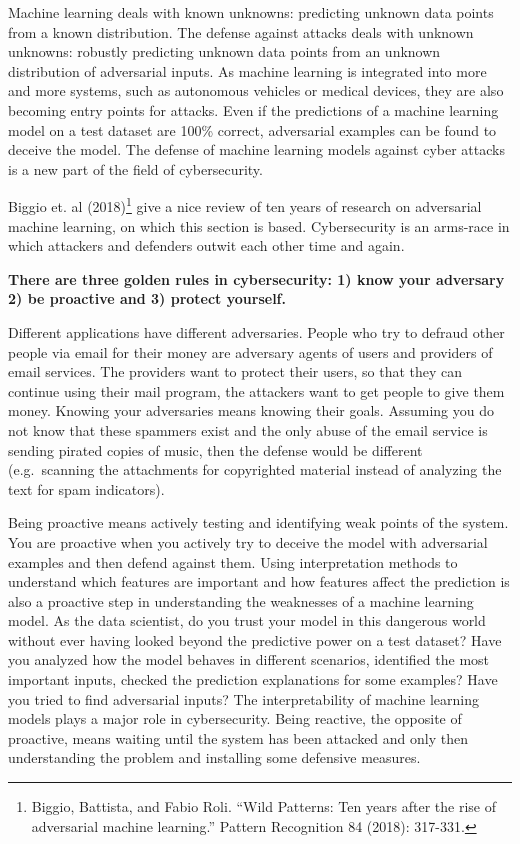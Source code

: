 \documentclass[
  12pt,
]{krantz}
\begin{document}
Machine learning deals with known unknowns: predicting unknown data points from a known distribution.
The defense against attacks deals with unknown unknowns: robustly predicting unknown data points from an unknown distribution of adversarial inputs.
As machine learning is integrated into more and more systems, such as autonomous vehicles or medical devices, they are also becoming entry points for attacks.
Even if the predictions of a machine learning model on a test dataset are 100\% correct, adversarial examples can be found to deceive the model.
The defense of machine learning models against cyber attacks is a new part of the field of cybersecurity.

Biggio et. al (2018)\footnote{Biggio, Battista, and Fabio Roli. ``Wild Patterns: Ten years after the rise of adversarial machine learning.'' Pattern Recognition 84 (2018): 317-331.} give a nice review of ten years of research on adversarial machine learning, on which this section is based.
Cybersecurity is an arms-race in which attackers and defenders outwit each other time and again.

\textbf{There are three golden rules in cybersecurity: 1) know your adversary 2) be proactive and 3) protect yourself.}

Different applications have different adversaries.
People who try to defraud other people via email for their money are adversary agents of users and providers of email services.
The providers want to protect their users, so that they can continue using their mail program, the attackers want to get people to give them money.
Knowing your adversaries means knowing their goals.
Assuming you do not know that these spammers exist and the only abuse of the email service is sending pirated copies of music, then the defense would be different (e.g.~scanning the attachments for copyrighted material instead of analyzing the text for spam indicators).

Being proactive means actively testing and identifying weak points of the system.
You are proactive when you actively try to deceive the model with adversarial examples and then defend against them.
Using interpretation methods to understand which features are important and how features affect the prediction is also a proactive step in understanding the weaknesses of a machine learning model.
As the data scientist, do you trust your model in this dangerous world without ever having looked beyond the predictive power on a test dataset?
Have you analyzed how the model behaves in different scenarios, identified the most important inputs, checked the prediction explanations for some examples?
Have you tried to find adversarial inputs?
The interpretability of machine learning models plays a major role in cybersecurity.
Being reactive, the opposite of proactive, means waiting until the system has been attacked and only then understanding the problem and installing some defensive measures.
\end{document}
